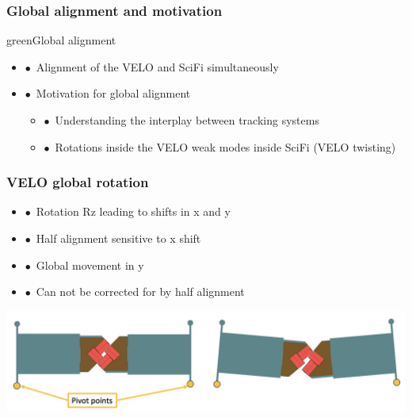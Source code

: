 \documentclass[aspectratio=1610, 12pt, xcolor=dvipsnames]{beamer}
\begin{document}
\begin{frame}\frametitle{Global alignment and motivation}
  \begin{mybox}{green}{Global alignment}
    \begin{itemize}
      \item $\bullet$\, Alignment of the VELO and SciFi simultaneously
    \end{itemize}
    \begin{itemize}
      \setlength\itemsep{0em}
      \item $\bullet$\, Motivation for global alignment
      \begin{itemize}
        \item $\bullet$\, Understanding the interplay between tracking systems
        \item $\bullet$\, Rotations inside the VELO \to weak modes inside SciFi (VELO twisting)
      \end{itemize}
    \end{itemize}
  \end{mybox}
\end{frame}

\begin{frame}\frametitle{VELO global rotation}
  \begin{itemize}
    \item $\bullet$\, Rotation Rz leading to shifts in x and y
    \item $\bullet$\, Half alignment sensitive to x shift
    \item $\bullet$\, Global movement in y
    \item $\bullet$\, Can not be corrected for by half alignment
  \end{itemize}
  \includegraphics[width=\textwidth]{plots/velo_rotation.png}
\end{frame}
\end{document}

